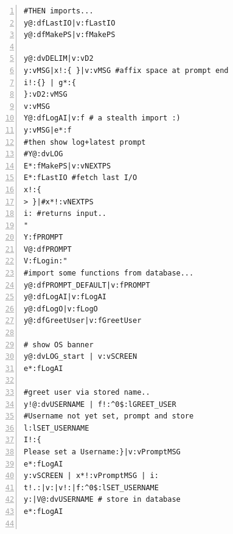 {\begin{tcolorbox}[teaterminalstyle, title=TEA Program: TOS v1.1.0 Complete Source-Code, breakable]
\begin{lstlisting}[language=TEA,breaklines=true,numbers=left]
#THEN imports...
y@:dfLastIO|v:fLastIO
y@:dfMakePS|v:fMakePS

y@:dvDELIM|v:vD2
y:vMSG|x!:{ }|v:vMSG #affix space at prompt end
i!:{} | g*:{
}:vD2:vMSG
v:vMSG
Y@:dfLogAI|v:f # a stealth import :)
y:vMSG|e*:f
#then show log+latest prompt
#Y@:dvLOG
E*:fMakePS|v:vNEXTPS
E*:fLastIO #fetch last I/O
x!:{
> }|#x*!:vNEXTPS
i: #returns input..
"
Y:fPROMPT
V@:dfPROMPT
V:fLogin:"
#import some functions from database...
y@:dfPROMPT_DEFAULT|v:fPROMPT
y@:dfLogAI|v:fLogAI
y@:dfLogO|v:fLogO
y@:dfGreetUser|v:fGreetUser

# show OS banner
y@:dvLOG_start | v:vSCREEN
e*:fLogAI

#greet user via stored name..
y!@:dvUSERNAME | f!:^0$:lGREET_USER
#Username not yet set, prompt and store
l:lSET_USERNAME
I!:{
Please set a Username:}|v:vPromptMSG
e*:fLogAI
y:vSCREEN | x*!:vPromptMSG | i:
t!.:|v:|v!:|f:^0$:lSET_USERNAME
y:|V@:dvUSERNAME # store in database
e*:fLogAI


\end{lstlisting}
\end{tcolorbox}}

